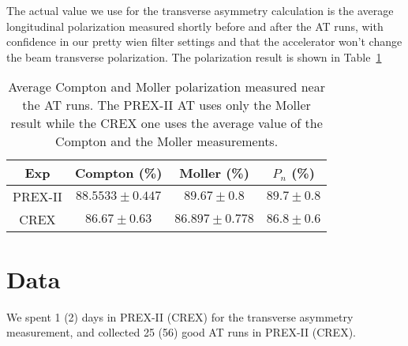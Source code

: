The actual value we use for the transverse asymmetry calculation is the 
average longitudinal polarization measured shortly before and after the AT runs, 
with confidence in our pretty wien filter settings and that the accelerator 
won't change the beam transverse polarization. 
The polarization result is shown in Table~\ref{tab:AT_polarization}
\begin{table}[!h]
    \centering
    \begin{tabular}{c | c c c}
    \hline
    Exp	& Compton (\%)	& Moller (\%)	& $P_n$ (\%) \\
    \hline
    PREX-II & $88.5533 \pm 0.447$   & $89.67 \pm 0.8$	& $89.7 \pm 0.8$  \\
    CREX    & $86.67 \pm 0.63$	& $86.897 \pm 0.778$	& $86.8 \pm 0.6$  \\
    \hline
    \end{tabular}
    \caption{Average Compton and Moller polarization measured near the AT runs. 
    The PREX-II AT uses only the Moller result while the CREX one uses the average value of the 
    Compton and the Moller measurements.}
    \label{tab:AT_polarization}
\end{table}

\section{Data}

We spent 1 (2) days in PREX-II (CREX) for the transverse asymmetry measurement,
and collected 25 (56) good AT runs in PREX-II (CREX).

